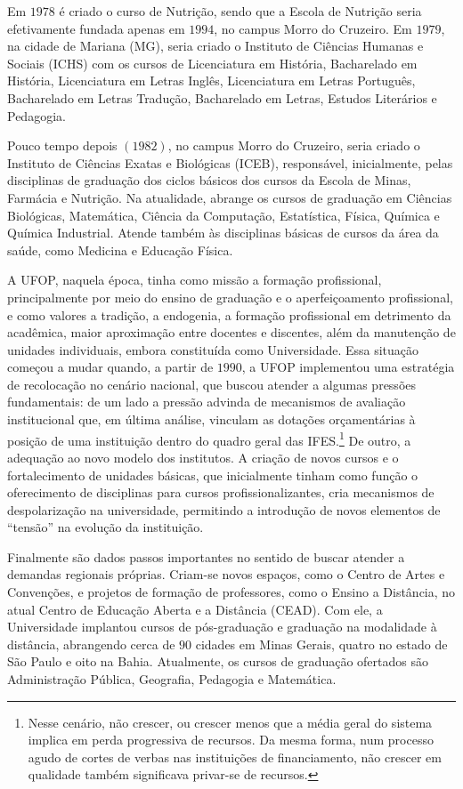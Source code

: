 \documentclass[
	12pt,				%
	openright,			%
	oneside,			%
	a4paper,			%
	english,			%
	brazil				%
	]{abntex2}
\begin{document}
Em $1978$ é criado o curso de Nutrição, sendo que a Escola de Nutrição seria efetivamente fundada apenas em $1994$, no campus Morro do Cruzeiro. Em $1979$, na cidade de Mariana (MG), seria criado o Instituto de Ciências Humanas e Sociais (ICHS) com os cursos de Licenciatura em História, Bacharelado em História, Licenciatura em Letras Inglês, Licenciatura em Letras Português, Bacharelado em Letras Tradução, Bacharelado em Letras, Estudos Literários e Pedagogia.

Pouco tempo depois $(1982)$, no campus Morro do Cruzeiro, seria criado o Instituto de Ciências Exatas e Biológicas (ICEB), responsável, inicialmente, pelas disciplinas de graduação dos ciclos básicos dos cursos da Escola de Minas, Farmácia e Nutrição. Na atualidade, abrange os cursos de graduação em Ciências Biológicas, Matemática, Ciência da Computação, Estatística, Física, Química e Química Industrial. Atende também às disciplinas básicas de cursos da área da saúde, como Medicina e Educação Física.

A UFOP, naquela época, tinha como missão a formação profissional, principalmente por meio do ensino de graduação e o aperfeiçoamento profissional, e como valores a tradição, a endogenia, a formação profissional em detrimento da acadêmica, maior aproximação entre docentes e discentes, além da manutenção de unidades individuais, embora constituída como Universidade. Essa situação começou a mudar quando, a partir de $1990$, a UFOP implementou uma estratégia de recolocação no cenário nacional, que buscou atender a algumas pressões fundamentais: de um lado a pressão advinda de mecanismos de avaliação institucional que, em última análise, vinculam as dotações orçamentárias à posição de uma instituição dentro do quadro geral das IFES.\footnote{Nesse cenário, não crescer, ou crescer menos que a média geral do sistema implica em perda progressiva de recursos. Da mesma forma, num processo agudo de cortes de verbas nas instituições de financiamento, não crescer em qualidade também significava privar-se de recursos.} De outro, a adequação ao novo modelo dos institutos. A criação de novos cursos e o fortalecimento de unidades básicas, que inicialmente tinham como função o oferecimento de disciplinas para cursos profissionalizantes, cria mecanismos de despolarização na universidade, permitindo a introdução de novos elementos de ``tensão'' na evolução da instituição.

Finalmente são dados passos importantes no sentido de buscar atender a demandas regionais próprias. Criam-se novos espaços, como o Centro de Artes e Convenções, e projetos de formação de professores, como o Ensino a Distância, no atual Centro de Educação Aberta e a Distância (CEAD). Com ele, a Universidade implantou cursos de pós-graduação e graduação na modalidade à distância, abrangendo cerca de $90$ cidades em Minas Gerais, quatro no estado de São Paulo e oito na Bahia. Atualmente, os cursos de graduação ofertados são Administração Pública, Geografia, Pedagogia e Matemática.
\end{document}
